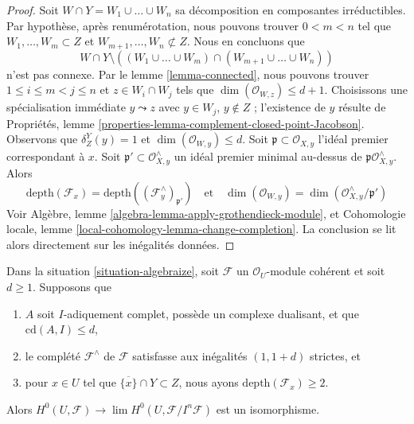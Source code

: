 \begin{proof}
Soit $W \cap Y = W_1 \cup \ldots \cup W_n$ sa décomposition en
composantes irréductibles. Par hypothèse, après renumérotation, nous pouvons trouver
$0 < m < n$ tel que $W_1, \ldots, W_m  \subset Z$ et
$W_{m + 1}, \ldots, W_n \not \subset Z$. Nous en concluons que
$$
W \cap Y \setminus
\left((W_1 \cup \ldots \cup W_m) \cap (W_{m + 1} \cup \ldots \cup W_n)\right)
$$
n'est pas connexe. Par le lemme \ref{lemma-connected}, nous pouvons trouver
$1 \leq i \leq m < j \leq n$ et
$z \in W_i \cap W_j$ tels que $\dim(\mathcal{O}_{W, z}) \leq d + 1$.
Choisissons une spécialisation immédiate $y \leadsto z$ avec
$y \in W_j$, $y \not \in Z$ ; l'existence de $y$ résulte de
Propriétés, lemme \ref{properties-lemma-complement-closed-point-Jacobson}.
Observons que $\delta^Y_Z(y) = 1$ et $\dim(\mathcal{O}_{W, y}) \leq d$.
Soit $\mathfrak p \subset \mathcal{O}_{X, y}$ l'idéal premier correspondant à $x$.
Soit $\mathfrak p' \subset \mathcal{O}_{X, y}^\wedge$ un idéal premier minimal
au-dessus de $\mathfrak p\mathcal{O}_{X, y}^\wedge$. Alors
$$
\text{depth}(\mathcal{F}_x) =
\text{depth}((\mathcal{F}^\wedge_y)_{\mathfrak p'})
\quad\text{et}\quad
\dim(\mathcal{O}_{W, y}) = \dim(\mathcal{O}_{X, y}^\wedge/\mathfrak p')
$$
Voir Algèbre, lemme \ref{algebra-lemma-apply-grothendieck-module}, et
Cohomologie locale, lemme \ref{local-cohomology-lemma-change-completion}.
La conclusion se lit alors directement sur les inégalités données.
\end{proof}

\begin{lemma}
\label{lemma-recover}
Dans la situation \ref{situation-algebraize}, soit $\mathcal{F}$ un
$\mathcal{O}_U$-module cohérent et soit $d \geq 1$. Supposons que
\begin{enumerate}
\item $A$ soit $I$-adiquement complet, possède un complexe dualisant, et que
$\text{cd}(A, I) \leq d$,
\item le complété $\mathcal{F}^\wedge$ de $\mathcal{F}$
satisfasse aux inégalités $(1, 1+ d)$ strictes, et
\item pour $x \in U$ tel que $\overline{\{x\}} \cap Y \subset Z$,
nous ayons $\text{depth}(\mathcal{F}_x) \geq 2$.
\end{enumerate}
Alors $H^0(U, \mathcal{F}) \to \lim H^0(U, \mathcal{F}/I^n\mathcal{F})$
est un isomorphisme.
\end{lemma}

